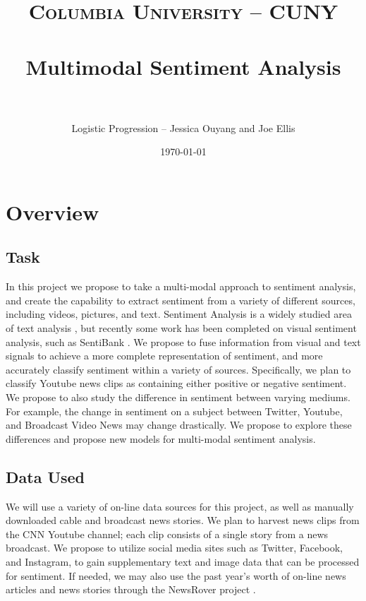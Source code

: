 \documentclass[paper=a4, fontsize=11pt]{scrartcl} %
\title{	
\normalfont \normalsize 
\textsc{Columbia University -- CUNY} \\ [25pt] %
\horrule{0.5pt} \\[0.4cm] %
\huge Multimodal Sentiment Analysis \\ %
\horrule{2pt} \\[0.5cm] %
}
\author{Logistic Progression -- Jessica Ouyang and Joe Ellis} %
\date{\normalsize\today} %
\begin{document}
\maketitle %


\section{Overview}


\subsection{Task}
In this project we propose to take a multi-modal approach to sentiment analysis, and create the capability to extract sentiment from a variety of different sources, including videos, pictures, and text.
Sentiment Analysis is a widely studied area of text analysis \cite{Pang}, but recently some work has been completed on visual sentiment analysis, such as SentiBank \cite{MM13:sentibank_long}.
We propose to fuse information from visual and text signals to achieve a more complete representation of sentiment, and more accurately classify sentiment within a variety of sources. 
Specifically, we plan to classify Youtube news clips as containing either positive or negative sentiment.
We propose to also study the difference in sentiment between varying mediums.
For example, the change in sentiment on a subject between Twitter, Youtube, and Broadcast Video News may change drastically.
We propose to explore these differences and propose new models for multi-modal sentiment analysis.


\subsection{Data Used}
We will use a variety of on-line data sources for this project, as well as manually downloaded cable and broadcast news stories. 
We plan to harvest news clips from the CNN Youtube channel; each clip consists of a single story from a news broadcast.
We propose to utilize social media sites such as Twitter, Facebook, and Instagram, to gain supplementary text and image data that can be processed for sentiment.
If needed, we may also use the past year's worth of on-line news articles and news stories through the NewsRover project \cite{MM13:structurednews}.
\end{document}
